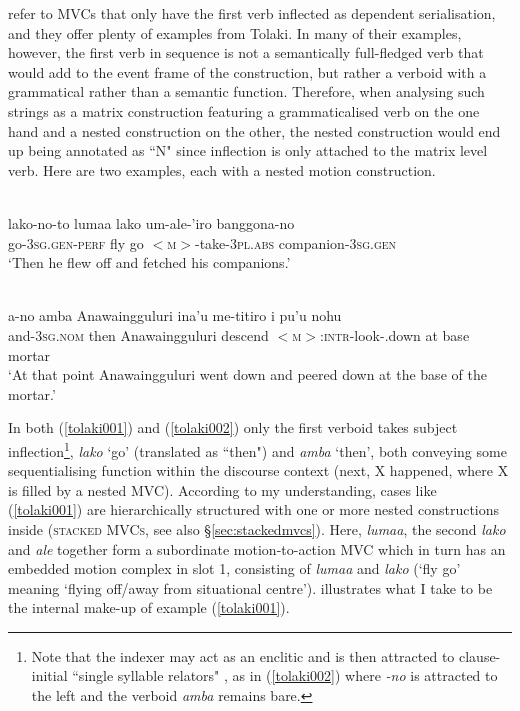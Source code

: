 \citet{mead2008verb} refer to MVCs that only have the first verb inflected as dependent serialisation, and they offer plenty of examples from Tolaki. In many of their examples, however, the first verb in sequence is not a semantically full-fledged verb that would add to the event frame of the construction, but rather a verboid with a grammatical rather than a semantic function. Therefore, when analysing such strings as a matrix construction featuring a grammaticalised verb on the one hand and a nested construction on the other, the nested construction would end up being annotated as ``N" since inflection is only attached to the matrix level verb. Here are two examples, each with a nested motion construction.

\ea \label{tolaki001}
\\
\gll lako-no-to lumaa lako um-ale-'iro banggona-no \\
go-3\textsc{sg}.\textsc{gen}-\textsc{perf} fly go $<$\textsc{m}$>$-take-3\textsc{pl}.\textsc{abs} companion-3\textsc{sg}.\textsc{gen} \\
\glft `Then he flew off and fetched his companions.' \\ 
\z

\ea \label{tolaki002}
\\
\gll a-no amba Anawaingguluri ina'u me-titiro i pu'u nohu \\
and-3\textsc{sg}.\textsc{nom} then Anawaingguluri descend $<$\textsc{m}$>$:\textsc{intr}-look-.down at base mortar \\
\glft `At that point Anawaingguluri went down and peered down at the base of the mortar.'\\ 
\z

In both (\ref{tolaki001}) and (\ref{tolaki002}) only the first verboid takes subject inflection\footnote{Note that the indexer may act as an enclitic and is then attracted to clause-initial ``single syllable relators" \citep[114]{mead2008verb}, as in (\ref{tolaki002}) where \textit{-no} is attracted to the left and the verboid \textit{amba} remains bare.}, \textit{lako} `go' (translated as ``then") and \textit{amba} `then', both conveying some sequentialising function within the discourse context (next, X happened, where X is filled by a nested MVC). According to my understanding, cases like (\ref{tolaki001}) are hierarchically structured with one or more nested constructions inside (\textsc{stacked MVCs}, see also §\ref{sec:stackedmvcs}). Here, \textit{lumaa}, the second \textit{lako} and \textit{ale} together form a subordinate motion-to-action MVC which in turn has an embedded motion complex in slot 1, consisting of \textit{lumaa} and \textit{lako} (`fly go' meaning `flying off/away from situational centre').  illustrates what I take to be the internal make-up of example (\ref{tolaki001}).

